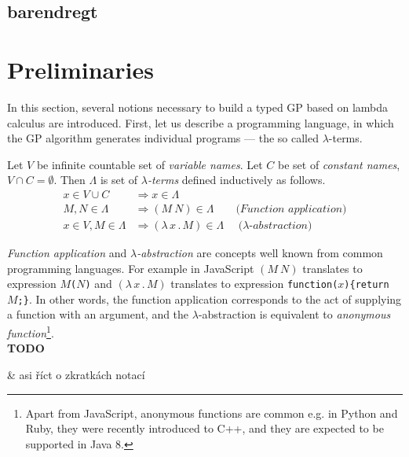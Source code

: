 \documentclass{llncs}
\newcommand{\lets}{let us\xspace}
\newcommand{\lterms}{$\lambda$-terms\xspace}
\newcommand{\then}{\Rightarrow\xspace}
\newcommand{\lamb}[2]{( \lambda \, #1 \, . \, #2 )}
\newenvironment{todo}
{~\\ {\color{red}\textbf{TODO}}
  \begin{easylist}[itemize]}
{ \end{easylist}}
\begin{document}
\subsection{barendregt}






\section{Preliminaries}
\label{preliminaries}

In this section, several notions necessary to build a typed GP based on lambda calculus are introduced. 
First, \lets 
describe a programming language, 
in which the GP algorithm generates individual programs --- the so called \lterms.  


\begin{definition}
Let $V$ be infinite countable set of {\it 
variable names}. Let $C$ be set of {\it constant names}, 
$V \cap C = \emptyset$.	 	
Then $\Lambda$ is set of {\it \lterms} defined inductively as follows.	
\begin{align*}
x   \in V \cup C  &\then x     \in \Lambda \\
M,N \in \Lambda   &\then (M~N) \in \Lambda 
\textit{~~~~~~(Function application)} \\
x   \in V , M \in \Lambda &\then \lamb{x}{M} \in \Lambda
\textit{~~~~($\lambda$-abstraction)} 
\end{align*}
\end{definition}

\textit{Function application} and 
\textit{$\lambda$-abstraction} are concepts
well known from common programming languages. 
For example in JavaScript 
$(M~N)$ translates to expression \texttt{$M$($N$)} and
$\lamb{x}{M}$ translates to expression \texttt{function($x$)\{return $M$;\}}.
In other words, the function application 
corresponds to the act of supplying a function 
with an argument, and
the $\lambda$-abstraction is equivalent to 
\textit{anonymous function}\footnote{Apart from JavaScript, anonymous functions are common e.g. in Python and Ruby, 
they were recently introduced to C++, and they are expected to be supported in Java 8.}.
\begin{todo}
 & asi říct o zkratkách notací
\end{todo}
\end{document}
